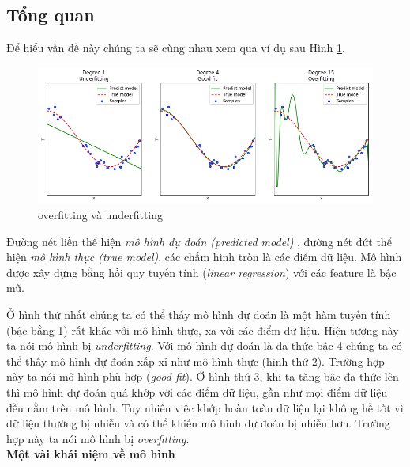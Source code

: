 \subsection{Tổng quan}
Để hiểu vấn đề này chúng ta sẽ cùng nhau xem qua ví dụ sau  Hình \ref{fig:overfitting}.
\begin{center}
 	\begin{figure}[H]
    \begin{center}
    \includegraphics[scale=0.5]{chap3/image/overfitting.png}
    \end{center}
    \caption{overfitting và underfitting}
    \label{fig:overfitting}
    \end{figure}
\end{center}
Đường nét liền thể hiện \textit{mô hình dự đoán (predicted model)} , đường nét đứt thể hiện \textit{mô hình thực (true model)}, các chấm hình tròn là các điểm dữ liệu. Mô hình được xây dựng bằng hồi quy tuyến tính (\textit{linear regression}) với các feature là bậc mũ.\par
Ở hình thứ nhất chúng ta có thể thấy mô hình dự đoán là một hàm tuyến tính (bậc bằng 1) rất khác với mô hình thực, xa với các điểm dữ liệu. Hiện tượng này ta nói mô hình bị \textit{underfitting}.
Với mô hình dự đoán là đa thức bậc 4 chúng ta có thể thấy mô hình dự đoán xấp xỉ như mô hình thực (hình thứ 2). Trường hợp này ta nói mô hình phù hợp (\textit{good fit}). Ở hình thứ 3, khi ta tăng bậc đa thức lên thì mô hình dự đoán quá khớp với các điểm dữ liệu, gần như mọi điểm dữ liệu đều nằm trên mô hình. Tuy nhiên việc khớp hoàn toàn dữ liệu lại không hề tốt vì dữ liệu thường bị nhiễu và có thể khiến mô hình dự đoán bị nhiễu hơn. Trường hợp này ta nói mô hình bị\textit{ overfitting}.\\
\textbf{Một vài khái niệm về mô hình}
